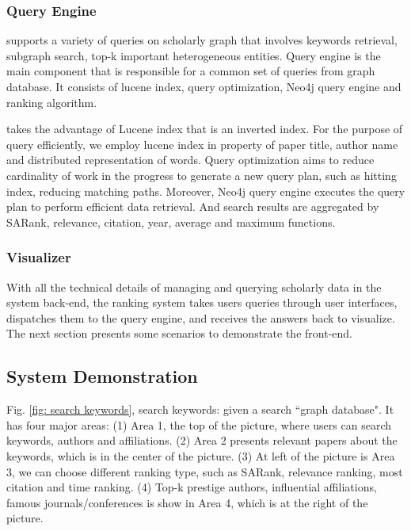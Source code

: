 

\subsubsection{Query Engine}
\oursystem supports a variety of queries on scholarly graph that involves keywords retrieval, subgraph search, top-k important heterogeneous entities. Query engine is the main component that is responsible for a common set of queries from graph database. It consists of lucene index, query optimization, Neo4j query engine and ranking algorithm. 

\par 
\oursystem takes the advantage of Lucene index that is an inverted index. For the purpose of query efficiently, we employ lucene index in property of paper title, author name and distributed representation of words. Query optimization aims to reduce cardinality of work in the progress to generate a new query plan, such as hitting index, reducing matching paths. Moreover, Neo4j query engine executes the query plan to perform efficient data retrieval. And search results are aggregated by SARank, relevance, citation, year, average and maximum functions.




\subsubsection{Visualizer}
With all the technical details of managing and querying scholarly data in the system back-end, the ranking system takes users queries through user interfaces, dispatches them to the query engine, and receives the answers back to visualize. The next section presents some scenarios to demonstrate the front-end.


\subsection{System Demonstration}
Fig. \ref{fig: search keywords}, search keywords: given a search ``graph database". It has four major areas: (1) Area 1, the top of the picture, where users can search keywords, authors and affiliations. (2) Area 2 presents relevant papers about the keywords, which is in the center of the picture. (3) At left of the picture is Area 3, we can choose different ranking type, such as SARank, relevance ranking, most citation and time ranking. (4) Top-k prestige authors, influential affiliations, famous journals/conferences is show in Area 4, which is at the right of the picture.




